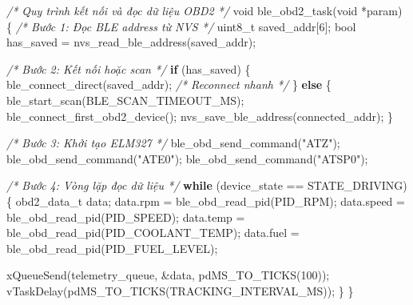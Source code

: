 \documentclass[a4paper]{extarticle}
\newenvironment{Shaded}{}{}
\newcommand{\CommentTok}[1]{\textcolor[rgb]{0.38,0.63,0.69}{\textit{#1}}}
\newcommand{\ControlFlowTok}[1]{\textcolor[rgb]{0.00,0.44,0.13}{\textbf{#1}}}
\newcommand{\DataTypeTok}[1]{\textcolor[rgb]{0.56,0.13,0.00}{#1}}
\newcommand{\DecValTok}[1]{\textcolor[rgb]{0.25,0.63,0.44}{#1}}
\newcommand{\NormalTok}[1]{#1}
\newcommand{\OperatorTok}[1]{\textcolor[rgb]{0.40,0.40,0.40}{#1}}
\newcommand{\StringTok}[1]{\textcolor[rgb]{0.25,0.44,0.63}{#1}}
\begin{document}
\begin{Shaded}
\begin{Highlighting}[]
\CommentTok{/* Quy trình kết nối và đọc dữ liệu OBD2 */}
\DataTypeTok{void}\NormalTok{ ble\_obd2\_task}\OperatorTok{(}\DataTypeTok{void} \OperatorTok{*}\NormalTok{param}\OperatorTok{)} \OperatorTok{\{}
    \CommentTok{/* Bước 1: Đọc BLE address từ NVS */}
    \DataTypeTok{uint8\_t}\NormalTok{ saved\_addr}\OperatorTok{[}\DecValTok{6}\OperatorTok{];}
    \DataTypeTok{bool}\NormalTok{ has\_saved }\OperatorTok{=}\NormalTok{ nvs\_read\_ble\_address}\OperatorTok{(}\NormalTok{saved\_addr}\OperatorTok{);}

    \CommentTok{/* Bước 2: Kết nối hoặc scan */}
    \ControlFlowTok{if} \OperatorTok{(}\NormalTok{has\_saved}\OperatorTok{)} \OperatorTok{\{}
\NormalTok{        ble\_connect\_direct}\OperatorTok{(}\NormalTok{saved\_addr}\OperatorTok{);}  \CommentTok{/* Reconnect nhanh */}
    \OperatorTok{\}} \ControlFlowTok{else} \OperatorTok{\{}
\NormalTok{        ble\_start\_scan}\OperatorTok{(}\NormalTok{BLE\_SCAN\_TIMEOUT\_MS}\OperatorTok{);}
\NormalTok{        ble\_connect\_first\_obd2\_device}\OperatorTok{();}
\NormalTok{        nvs\_save\_ble\_address}\OperatorTok{(}\NormalTok{connected\_addr}\OperatorTok{);}
    \OperatorTok{\}}

    \CommentTok{/* Bước 3: Khởi tạo ELM327 */}
\NormalTok{    ble\_obd\_send\_command}\OperatorTok{(}\StringTok{"ATZ"}\OperatorTok{);}
\NormalTok{    ble\_obd\_send\_command}\OperatorTok{(}\StringTok{"ATE0"}\OperatorTok{);}
\NormalTok{    ble\_obd\_send\_command}\OperatorTok{(}\StringTok{"ATSP0"}\OperatorTok{);}

    \CommentTok{/* Bước 4: Vòng lặp đọc dữ liệu */}
    \ControlFlowTok{while} \OperatorTok{(}\NormalTok{device\_state }\OperatorTok{==}\NormalTok{ STATE\_DRIVING}\OperatorTok{)} \OperatorTok{\{}
\NormalTok{        obd2\_data\_t data}\OperatorTok{;}
\NormalTok{        data}\OperatorTok{.}\NormalTok{rpm   }\OperatorTok{=}\NormalTok{ ble\_obd\_read\_pid}\OperatorTok{(}\NormalTok{PID\_RPM}\OperatorTok{);}
\NormalTok{        data}\OperatorTok{.}\NormalTok{speed }\OperatorTok{=}\NormalTok{ ble\_obd\_read\_pid}\OperatorTok{(}\NormalTok{PID\_SPEED}\OperatorTok{);}
\NormalTok{        data}\OperatorTok{.}\NormalTok{temp  }\OperatorTok{=}\NormalTok{ ble\_obd\_read\_pid}\OperatorTok{(}\NormalTok{PID\_COOLANT\_TEMP}\OperatorTok{);}
\NormalTok{        data}\OperatorTok{.}\NormalTok{fuel  }\OperatorTok{=}\NormalTok{ ble\_obd\_read\_pid}\OperatorTok{(}\NormalTok{PID\_FUEL\_LEVEL}\OperatorTok{);}

\NormalTok{        xQueueSend}\OperatorTok{(}\NormalTok{telemetry\_queue}\OperatorTok{,} \OperatorTok{\&}\NormalTok{data}\OperatorTok{,}\NormalTok{ pdMS\_TO\_TICKS}\OperatorTok{(}\DecValTok{100}\OperatorTok{));}
\NormalTok{        vTaskDelay}\OperatorTok{(}\NormalTok{pdMS\_TO\_TICKS}\OperatorTok{(}\NormalTok{TRACKING\_INTERVAL\_MS}\OperatorTok{));}
    \OperatorTok{\}}
\OperatorTok{\}}
\end{Highlighting}
\end{Shaded}
\end{document}
